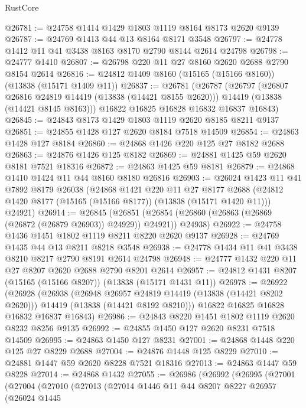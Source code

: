 \begin{lexlean}{RustCore}
\begin{coremodule}
@26781 := @24758 @1414 @1429 @1803 @1119 @8164 @8173 @2620 @9139
@26787 := @24769 @1413 @44 @13 @8164 @8171 @3548
@26797 := @24778 @1412 @11 @41 @3438 @8163 @8170 @2790 @8144 @2614 @24798
@26798 := @24777 @1410
@26807 := @26798 @220 @11 @27 @8160 @2620 @2688 @2790 @8154 @2614
@26816 := @24812 @1409 @8160 (@15165 (@15166 @8160)) (@13838 (@15171 @1409 @11))
@26837 := @26781
    (@26787
      (@26797
        (@26807 @26816 @24819 @14419 (@13838 (@14421 @8155 @2620)))
        @14419
        (@13838 (@14421 @8145 @8163)))
      @16822
      @16825
      @16828
      @16832
      @16837
      @16843)
@26845 := @24843 @8173 @1429 @1803 @1119 @2620 @8185 @8211 @9137
@26851 := @24855 @1428 @127 @2620 @8184 @7518 @14509
@26854 := @24863 @1428 @127 @8184
@26860 := @24868 @1426 @220 @125 @27 @8182 @2688
@26863 := @24876 @1426 @125 @8182
@26869 := @24881 @1425 @59 @2620 @8181 @7521 @18316
@26872 := @24863 @1425 @59 @8181
@26879 := @24868 @1410 @1424 @11 @44 @8160 @8180 @26816
@26903 := @26024
    @1423
    @11
    @41
    @7892
    @8179
    @26038
    (@24868
      @1421
      @220
      @11
      @27
      @8177
      @2688
      (@24812 @1420 @8177 (@15165 (@15166 @8177)) (@13838 (@15171 @1420 @11)))
      @24921)
@26914 := @26845
    (@26851 (@26854 (@26860 (@26863 (@26869 (@26872 (@26879 @26903)) @24929)) @24921)) @24938)
@26922 := @24758 @1436 @1451 @1802 @1119 @8211 @8220 @2620 @9137
@26928 := @24769 @1435 @44 @13 @8211 @8218 @3548
@26938 := @24778 @1434 @11 @41 @3438 @8210 @8217 @2790 @8191 @2614 @24798
@26948 := @24777 @1432 @220 @11 @27 @8207 @2620 @2688 @2790 @8201 @2614
@26957 := @24812 @1431 @8207 (@15165 (@15166 @8207)) (@13838 (@15171 @1431 @11))
@26978 := @26922
    (@26928
      (@26938
        (@26948 @26957 @24819 @14419 (@13838 (@14421 @8202 @2620)))
        @14419
        (@13838 (@14421 @8192 @8210)))
      @16822
      @16825
      @16828
      @16832
      @16837
      @16843)
@26986 := @24843 @8220 @1451 @1802 @1119 @2620 @8232 @8256 @9135
@26992 := @24855 @1450 @127 @2620 @8231 @7518 @14509
@26995 := @24863 @1450 @127 @8231
@27001 := @24868 @1448 @220 @125 @27 @8229 @2688
@27004 := @24876 @1448 @125 @8229
@27010 := @24881 @1447 @59 @2620 @8228 @7521 @18316
@27013 := @24863 @1447 @59 @8228
@27014 := @24868 @1432
@27055 := @26986
    (@26992
      (@26995
        (@27001
          (@27004
            (@27010
              (@27013
                (@27014
                  @1446
                  @11
                  @44
                  @8207
                  @8227
                  @26957
                  (@26024
                    @1445

\end{coremodule}
\end{lexlean}
